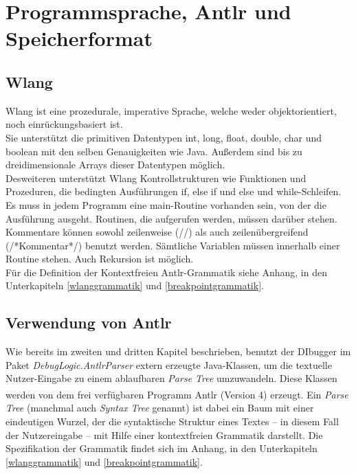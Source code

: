 \documentclass[parskip=full]{scrartcl}
\begin{document}
\newpage
\section{Programmsprache, Antlr und Speicherformat}\label{FormSpez}

\subsection{Wlang}

Wlang ist eine prozedurale, imperative Sprache, welche weder objektorientiert, noch einrückungsbasiert ist. \\
Sie unterstützt die primitiven Datentypen int, long, float, double, char und boolean mit den selben Genauigkeiten wie Java.
Außerdem sind  bis zu dreidimensionale Arrays dieser Datentypen möglich. \\
Desweiteren unterstützt Wlang Kontrollstrukturen wie Funktionen und Prozeduren, die bedingten Ausführungen if, else if und else und while-Schleifen. \\
Es muss in jedem Programm eine main-Routine vorhanden sein, von der die Ausführung ausgeht. Routinen, die aufgerufen werden, müssen darüber stehen. Kommentare können
sowohl zeilenweise (//) als auch zeilenübergreifend (/*Kommentar*/) benutzt werden.
Sämtliche Variablen müssen innerhalb einer Routine stehen. Auch Rekursion ist möglich. \\
Für die Definition der Kontextfreien Antlr-Grammatik siehe Anhang, in den Unterkapiteln \ref{wlanggrammatik} und \ref{breakpointgrammatik}.


\subsection{Verwendung von Antlr}

Wie bereits im zweiten und dritten Kapitel beschrieben, benutzt der DIbugger im Paket \textit{DebugLogic.AntlrParser} extern erzeugte Java-Klassen, um die textuelle Nutzer-Eingabe zu einem ablaufbaren \textit{Parse Tree} umzuwandeln. Diese Klassen werden von dem frei verfügbaren Programm Antlr\textsuperscript{\textcopyright} (Version 4) erzeugt.
Ein \textit{Parse Tree} (manchmal auch \textit{Syntax Tree} genannt) ist dabei ein Baum mit einer eindeutigen Wurzel, der die syntaktische Struktur eines Textes – in diesem Fall der Nutzereingabe – mit Hilfe einer kontextfreien Grammatik darstellt. Die Spezifikation der Grammatik findet sich im Anhang, in den Unterkapiteln \ref{wlanggrammatik} und \ref{breakpointgrammatik}.
\end{document}
